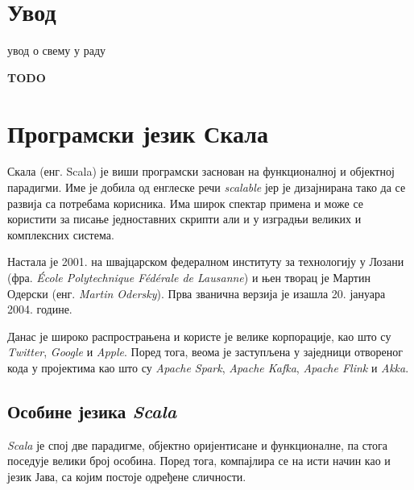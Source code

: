 \documentclass[12pt,oneside]{memoir}
\begin{document}
\frontmatter
\naslovna
\komisija
\apstrakt
\tableofcontents*

\mainmatter


\chapter{Увод}
\label{chp:uvod}

увод о свему у раду

\textbf{TODO}

\chapter{Програмски језик Скала}
\label{chp:scala}

Скала (енг. Scala) је виши програмски заснован на функционалној и објектној парадигми. Име је добила од енглеске речи \textit{scalable} јер је дизајнирана тако да се развија са потребама корисника. Има широк спектар примена и може се користити за писање једноставних скрипти али и у изградњи великих и комплексних система. \cite{scala_prog}

Настала је 2001. на швајцарском федералном институту за технологију у Лозани (фра. \textit{École Polytechnique Fédérale de Lausanne}) и њен творац је Мартин Одерски (енг. \textit{Martin Odersky}). Прва званична верзија је изашла 20. јануара 2004. године.

Данас је широко распрострањена и користе је велике корпорације, као што су \textit{Twitter}, \textit{Google} и \textit{Apple}. Поред тога, веома је заступљена у заједници отвореног кода у пројектима као што су \textit{Apache Spark}, \textit{Apache Kafka}, \textit{Apache Flink} и \textit{Akka}.

\section{Особине језика \textit{Scala}}
\label{sec:osоб_scala}

\textit{Scala} је спој две парадигме, објектно оријентисане и функционалне, па стога поседује велики број особина. Поред тога, компајлира се на исти начин као и језик Јава, са којим постоје одређене сличности.
\end{document}
